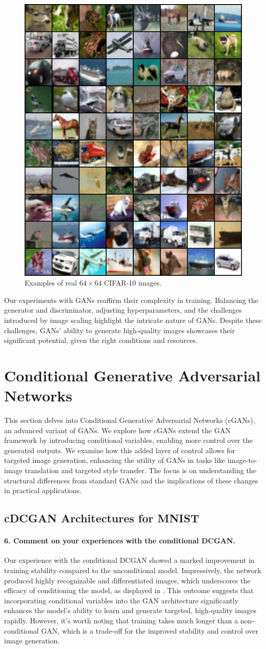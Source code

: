 \begin{figure}[H]
    \centering
    \includegraphics[width=0.2\linewidth]{cifar10/64_nz100/real_sample_epoch_0030.png}
    \caption{Examples of real $64 \times 64$ CIFAR-10 images.}
    \label{fig:cifar10_64_nz100_real}
\end{figure}%

Our experiments with GANs reaffirm their complexity in training. Balancing the generator and discriminator, adjusting hyperparameters, and the challenges introduced by image scaling highlight the intricate nature of GANs. Despite these challenges, GANs' ability to generate high-quality images showcases their significant potential, given the right conditions and resources.

\section{Conditional Generative Adversarial Networks}

This section delves into Conditional Generative Adversarial Networks (cGANs), an advanced variant of GANs. We explore how cGANs extend the GAN framework by introducing conditional variables, enabling more control over the generated outputs. We examine how this added layer of control allows for targeted image generation, enhancing the utility of GANs in tasks like image-to-image translation and targeted style transfer. The focus is on understanding the structural differences from standard GANs and the implications of these changes in practical applications.

\subsection{cDCGAN Architectures for MNIST}

\paragraph*{6. Comment on your experiences with the conditional DCGAN.}

Our experience with the conditional DCGAN showed a marked improvement in training stability compared to the unconditional model. Impressively, the network produced highly recognizable and differentiated images, which underscores the efficacy of conditioning the model, as displayed in . This outcome suggests that incorporating conditional variables into the GAN architecture significantly enhances the model's ability to learn and generate targeted, high-quality images rapidly. However, it's worth noting that training takes much longer than a non-conditional GAN, which is a trade-off for the improved stability and control over image generation.

